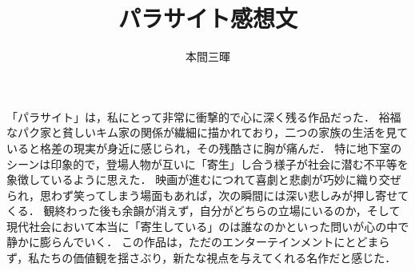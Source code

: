 \documentclass[titlepage,a4paper]{jsarticle}
\title{パラサイト感想文}
\author{本間三暉}
\begin{document}
\maketitle
「パラサイト」は，私にとって非常に衝撃的で心に深く残る作品だった．
裕福なパク家と貧しいキム家の関係が繊細に描かれており，二つの家族の生活を見ていると格差の現実が身近に感じられ，その残酷さに胸が痛んだ．
特に地下室のシーンは印象的で，登場人物が互いに「寄生」し合う様子が社会に潜む不平等を象徴しているように思えた．
映画が進むにつれて喜劇と悲劇が巧妙に織り交ぜられ，思わず笑ってしまう場面もあれば，次の瞬間には深い悲しみが押し寄せてくる．
観終わった後も余韻が消えず，自分がどちらの立場にいるのか，そして現代社会において本当に「寄生している」のは誰なのかといった問いが心の中で静かに膨らんでいく．
この作品は，ただのエンターテインメントにとどまらず，私たちの価値観を揺さぶり，新たな視点を与えてくれる名作だと感じた．
\end{document}
